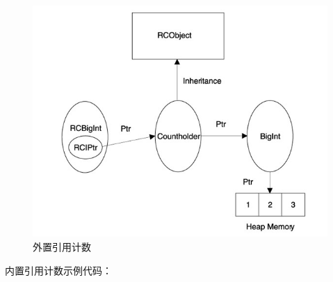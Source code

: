 \begin{figure}[ht]
	\begin{center}
		\includegraphics[keepaspectratio,width=0.4\paperwidth]{Pictures/RCObject-out.jpg}
	\caption{外置引用计数}
	\label{fig:RCObject}
	\end{center}
\end{figure}

内置引用计数示例代码：




\clearpage
















